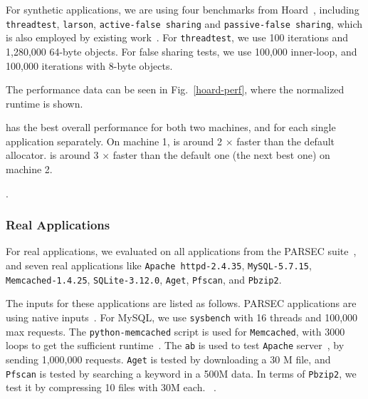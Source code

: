 For synthetic applications, we are using four benchmarks from Hoard~\cite{Hoard}, including \texttt{threadtest}, \texttt{larson}, \texttt{active-false sharing} and \texttt{passive-false sharing}, which is also employed by existing work~\cite{Scalloc}. For \texttt{threadtest}, we use 100 iterations and 1,280,000 64-byte objects.   For false sharing tests, we use 100,000 inner-loop, and 100,000 iterations with 8-byte objects.

The performance data can be seen in Fig.~\ref{hoard-perf}, where the normalized runtime is shown. 

\NM{} has the best overall performance for both two machines, and for each single application separately. On machine 1, \NM{} is around 2 $\times$ faster than the default allocator. \NM{} is around 3 $\times$ faster than the default one (the next best one) on machine 2.  

. 
 
\subsubsection{Real Applications}
\label{sec:synthetic}

For real applications, we evaluated on all applications from the PARSEC suite~\cite{parsec}, and seven real applications like \texttt{Apache httpd-2.4.35}, \texttt{MySQL-5.7.15}, \texttt{Memcached-1.4.25}, \texttt{SQLite-3.12.0}, \texttt{Aget}, \texttt{Pfscan}, and \texttt{Pbzip2}. 

The inputs for these applications are listed as follows. PARSEC applications are using native inputs~\cite{parsec}. For MySQL, we use \texttt{sysbench} with 16 threads and 100,000 max requests. The \texttt{python-memcached} script is used for \texttt{Memcached}, with 3000 loops to get the sufficient runtime~\cite{memcached}. The  \texttt{ab} is used to test \texttt{Apache} server~\cite{apachetest}, by sending 1,000,000 requests. \texttt{Aget} is tested  by downloading a 30 M file, and \texttt{Pfscan} is tested by searching  a keyword in a 500M data. In terms of \texttt{Pbzip2}, we test it by compressing 10 files with 30M each. ~\cite{sqlitetest}. 

